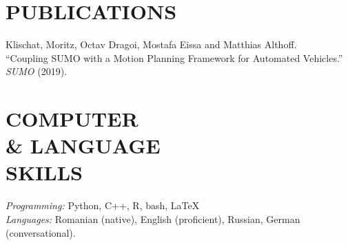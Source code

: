 \documentclass[margin]{res}
\begin{document}
\begin{resume}
  \section{PUBLICATIONS} 
  Klischat, Moritz, Octav Dragoi, Mostafa Eissa and Matthias Althoff. \\
  “Coupling SUMO with a Motion Planning Framework for Automated Vehicles.” \\
  \textit{SUMO} (2019).

  \section{COMPUTER \\ \& LANGUAGE \\ SKILLS} {\sl Programming:\/} Python, C++, R, bash, \LaTeX  \\
  {\sl Languages:\/} Romanian (native), English (proficient), Russian, German (conversational).

\end{resume}
\end{document}
